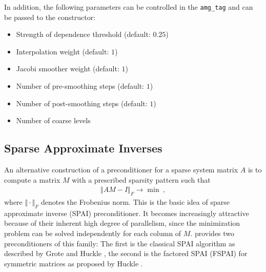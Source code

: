 In addition, the following parameters can be controlled in the \lstinline|amg_tag| and can be passed to the constructor:
\begin{itemize}
 \item Strength of dependence threshold (default: $0.25$)
 \item Interpolation weight (default: $1$)
 \item Jacobi smoother weight (default: $1$)
 \item Number of pre-smoothing steps (default: $1$)
 \item Number of post-smoothing steps (default: $1$)
 \item Number of coarse levels
\end{itemize}


\subsection{Sparse Approximate Inverses}



An alternative construction of a preconditioner for a sparse system matrix $A$ is to compute a matrix $M$ with a prescribed sparsity pattern such that
\begin{align}
 \Vert AM - I \Vert_F \rightarrow \min \ ,
\end{align}
where $\Vert \cdot \Vert_F$ denotes the Frobenius norm.
This is the basic idea of sparse approximate inverse (SPAI) preconditioner. It becomes increasingly attractive because of their inherent high degree of
parallelism, since the minimization problem can be solved independently for each column of $M$. {\ViennaCL} provides two preconditioners of
this family: The first is the classical SPAI algorithm as described by Grote and Huckle \cite{grote:spai}, the second is the factored SPAI (FSPAI) for symmetric
matrices as proposed by Huckle \cite{huckle:fspai}.

